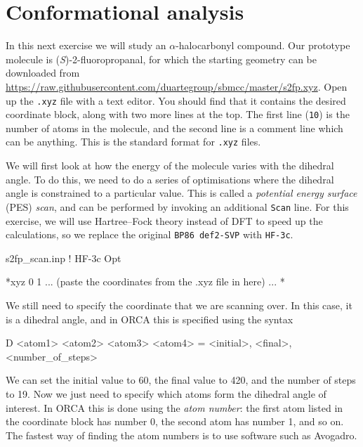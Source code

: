 \documentclass[10pt]{article}
\begin{document}
\section{Conformational analysis}

In this next exercise we will study an \(\alpha\)-halocarbonyl compound. Our prototype molecule is (\textit{S})-2-fluoropropanal, for which the starting geometry can be downloaded from \url{https://raw.githubusercontent.com/duartegroup/sbmcc/master/s2fp.xyz}. Open up the \texttt{.xyz} file with a text editor. You should find that it contains the desired coordinate block, along with two more lines at the top. The first line (\texttt{10}) is the number of atoms in the molecule, and the second line is a comment line which can be anything. This is the standard format for \texttt{.xyz} files.

We will first look at how the energy of the molecule varies with the  dihedral angle. To do this, we need to do a series of optimisations where the dihedral angle is constrained to a particular value. This is called a \textit{potential energy surface} (PES) \textit{scan}, and can be performed by invoking an additional \texttt{Scan} line. For this exercise, we will use Hartree--Fock theory instead of DFT to speed up the calculations, so we replace the original \texttt{BP86 def2-SVP} with \texttt{HF-3c}.

\begin{script}{s2fp\_scan.inp}
! HF-3c Opt



*xyz 0 1
 ... (paste the coordinates from the .xyz file in here) ...
*
\end{script}

We still need to specify the coordinate that we are scanning over. In this case, it is a dihedral angle, and in ORCA this is specified using the syntax

\begin{cmdline}
D <atom1> <atom2> <atom3> <atom4> = <initial>, <final>, <number_of_steps>
\end{cmdline}

We can set the initial value to 60, the final value to 420, and the number of steps to 19. Now we just need to specify which atoms form the dihedral angle of interest. In ORCA this is done using the \textit{atom number}: the first atom listed in the coordinate block has number 0, the second atom has number 1, and so on. The fastest way of finding the atom numbers is to use software such as Avogadro.
\end{document}
